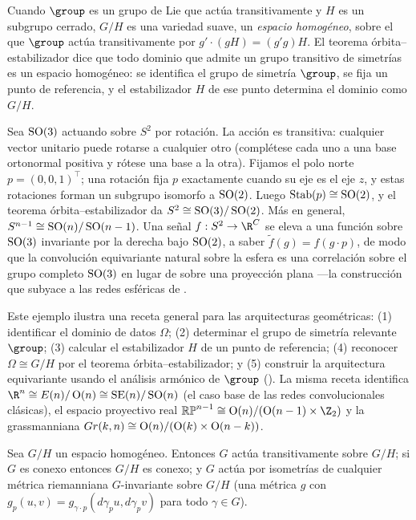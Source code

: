 Cuando $\group$ es un grupo de Lie que act\'ua transitivamente y $H$ es un subgrupo
cerrado, $G/H$ es una variedad suave, un \emph{espacio homog\'eneo}, sobre el que
$\group$ act\'ua transitivamente por $g'\cdot(gH) = (g'g)H$. El teorema
\'orbita--estabilizador dice que todo dominio que admite un grupo transitivo de
simetr\'ias es un espacio homog\'eneo: se identifica el grupo de simetr\'ia
$\group$, se fija un punto de referencia, y el estabilizador $H$ de ese punto
determina el dominio como $G/H$.

\begin{example}
\label{ex:found:sphere}
Sea $\operatorname{SO}(3)$ actuando sobre $S^2$ por rotaci\'on. La acci\'on es transitiva:
cualquier vector unitario puede rotarse a cualquier otro (compl\'etese cada uno a
una base ortonormal positiva y r\'otese una base a la otra). Fijamos el polo norte
$p = (0,0,1)^\top$; una rotaci\'on fija $p$ exactamente cuando su eje es el eje
$z$, y estas rotaciones forman un subgrupo isomorfo a $\operatorname{SO}(2)$. Luego $\operatorname{Stab}(p)
\cong \operatorname{SO}(2)$, y el teorema \'orbita--estabilizador da $S^2 \cong \operatorname{SO}(3)/\operatorname{SO}(2)$.
M\'as en general, $S^{n-1} \cong \operatorname{SO}(n)/\operatorname{SO}(n-1)$. Una se\~nal $f : S^2 \to \R^C$ se
eleva a una funci\'on sobre $\operatorname{SO}(3)$ invariante por la derecha bajo $\operatorname{SO}(2)$, a
saber $\tilde f(g) = f(g\cdot p)$, de modo que la convoluci\'on equivariante natural
sobre la esfera es una correlaci\'on sobre el grupo completo $\operatorname{SO}(3)$ en lugar de
sobre una proyecci\'on plana ---la construcci\'on que subyace a las redes
esf\'ericas de .
\end{example}

Este ejemplo ilustra una receta general para las arquitecturas geom\'etricas: (1)
identificar el dominio de datos $\Omega$; (2) determinar el grupo de simetr\'ia
relevante $\group$; (3) calcular el estabilizador $H$ de un punto de referencia;
(4) reconocer $\Omega \cong G/H$ por el teorema \'orbita--estabilizador; y (5)
construir la arquitectura equivariante usando el an\'alisis arm\'onico de $\group$
(). La misma receta identifica $\R^n \cong E(n)/\Orth(n)
\cong \SE(n)/\SO(n)$ (el caso base de las redes convolucionales cl\'asicas), el
espacio proyectivo real $\mathbb{RP}^{n-1} \cong \Orth(n)/(\Orth(n-1) \times \Z_2)$
y la grassmanniana $Gr(k,n) \cong \operatorname{O}(n)/(\operatorname{O}(k) \times \operatorname{O}(n-k))$.

\begin{proposition}
\label{prop:found:homogeneous-props}
Sea $G/H$ un espacio homog\'eneo. Entonces $G$ act\'ua transitivamente sobre $G/H$;
si $G$ es conexo entonces $G/H$ es conexo; y $G$ act\'ua por isometr\'ias de
cualquier m\'etrica riemanniana $G$-invariante sobre $G/H$ (una m\'etrica $g$ con
$g_p(u,v) = g_{\gamma\cdot p}(d\gamma_p u, d\gamma_p v)$ para todo $\gamma \in G$).
\end{proposition}

